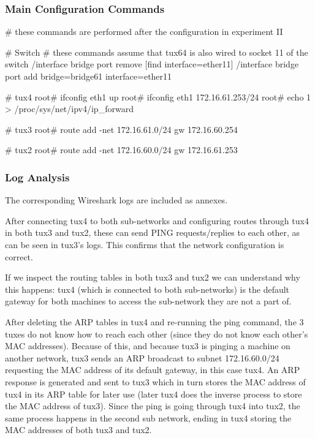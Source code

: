 \documentclass[11pt,a4paper,twocolumn]{article}
\begin{document}
\subsubsection{Main Configuration Commands}

\begin{code-bash}
# these commands are performed after the configuration in experiment II

# Switch
# these commands assume that tux64 is also wired to socket 11 of the switch
/interface bridge port remove [find interface=ether11]
/interface bridge port add bridge=bridge61 interface=ether11

# tux4
root# ifconfig eth1 up
root# ifconfig eth1 172.16.61.253/24
root# echo 1 > /proc/sys/net/ipv4/ip_forward

# tux3
root# route add -net 172.16.61.0/24 gw 172.16.60.254

# tux2
root# route add -net 172.16.60.0/24 gw 172.16.61.253
\end{code-bash}

\subsubsection{Log Analysis}

The corresponding Wireshark logs are included as annexes.

After connecting tux4 to both sub-networks and configuring routes through tux4 in both tux3 and tux2, these can send PING requests/replies to each other, as can be seen in tux3's logs. This confirms that the network configuration is correct.

If we inspect the routing tables in both tux3 and tux2 we can understand why this happens: tux4 (which is connected to both sub-networks) is the default gateway for both machines to access the sub-network they are not a part of.

After deleting the ARP tables in tux4 and re-running the ping command, the 3 tuxes do not know how to reach each other (since they do not know each other's MAC addresses).
Because of this, and because tux3 is pinging a machine on another network, tux3 sends an ARP broadcast to subnet 172.16.60.0/24 requesting the MAC address of its default gateway, in this case tux4.
An ARP response is generated and sent to tux3 which in turn stores the MAC address of tux4 in its ARP table for later use (later tux4 does the inverse process to store the MAC address of tux3).
Since the ping is going through tux4 into tux2, the same process happens in the second sub network, ending in tux4 storing the MAC addresses of both tux3 and tux2.
\end{document}
